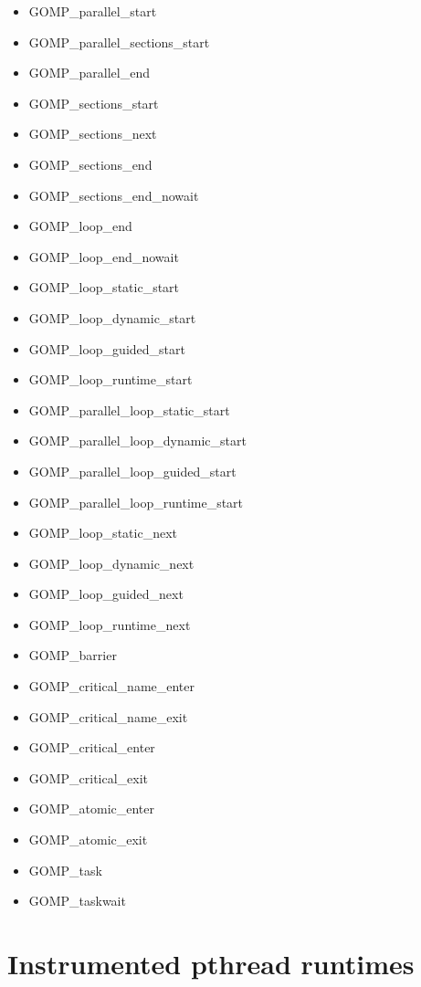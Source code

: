 \begin{itemize}
\item GOMP\_parallel\_start
\item GOMP\_parallel\_sections\_start
\item GOMP\_parallel\_end
\item GOMP\_sections\_start
\item GOMP\_sections\_next
\item GOMP\_sections\_end
\item GOMP\_sections\_end\_nowait
\item GOMP\_loop\_end
\item GOMP\_loop\_end\_nowait
\item GOMP\_loop\_static\_start
\item GOMP\_loop\_dynamic\_start
\item GOMP\_loop\_guided\_start
\item GOMP\_loop\_runtime\_start
\item GOMP\_parallel\_loop\_static\_start
\item GOMP\_parallel\_loop\_dynamic\_start
\item GOMP\_parallel\_loop\_guided\_start
\item GOMP\_parallel\_loop\_runtime\_start
\item GOMP\_loop\_static\_next
\item GOMP\_loop\_dynamic\_next
\item GOMP\_loop\_guided\_next
\item GOMP\_loop\_runtime\_next
\item GOMP\_barrier
\item GOMP\_critical\_name\_enter\footnotemark[4]
\item GOMP\_critical\_name\_exit\footnotemark[4]
\item GOMP\_critical\_enter\footnotemark[4]
\item GOMP\_critical\_exit\footnotemark[4]
\item GOMP\_atomic\_enter\footnotemark[4]
\item GOMP\_atomic\_exit\footnotemark[4]
\item GOMP\_task
\item GOMP\_taskwait
\end{itemize}

\section{Instrumented pthread runtimes}\label{sec:OpenMPruntimesinstrumented}

